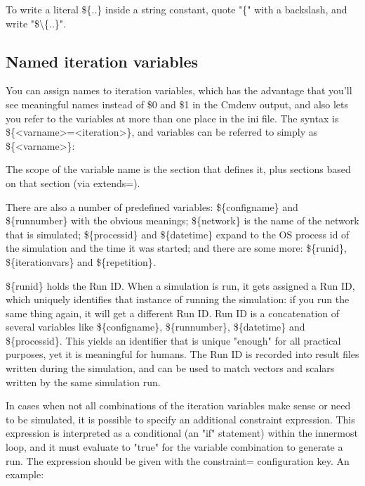To write a literal \$\{..\} inside a string constant, quote
"\{" with a backslash, and write "\${\textbackslash}\{..\}".


\subsection{Named iteration variables}

You can assign names to iteration variables, which has the advantage
that you'll see meaningful names instead of \$0 and
\$1 in the Cmdenv output, and also lets you refer to the variables at
more than one place in the ini file. The syntax is
\$\{<varname>=<iteration>\}, and variables can be referred to simply as
\$\{<varname>\}:


The scope of the variable name is the section that defines it, plus
sections based on that section (via extends=).

There are also a number of predefined variables: \$\{configname\} and
\$\{runnumber\} with the obvious meanings; \$\{network\} is the name of
the network that is simulated; \$\{processid\} and \$\{datetime\}
expand to the OS process id of the simulation and the time it was
started; and there are some more: \$\{runid\}, \$\{iterationvars\} and
\$\{repetition\}.

\$\{runid\} holds the Run ID. When a simulation is run, it gets assigned
a Run ID, which uniquely identifies that instance of running the
simulation: if you run the same thing again, it will get a different
Run ID. Run ID is a concatenation of several variables like
\$\{configname\}, \$\{runnumber\}, \$\{datetime\} and \$\{processid\}.
This yields an identifier that is unique
"enough" for all practical purposes, yet it
is meaningful for humans. The Run ID is recorded into result files
written during the simulation, and can be used to match vectors and
scalars written by the same simulation run.

In cases when not all combinations of the iteration variables make sense
or need to be simulated, it is possible to specify an additional
constraint expression. This expression is interpreted as a conditional
(an "if" statement) within the innermost
loop, and it must evaluate to "true" for
the variable combination to generate a run. The expression should be
given with the constraint= configuration key. An example:

